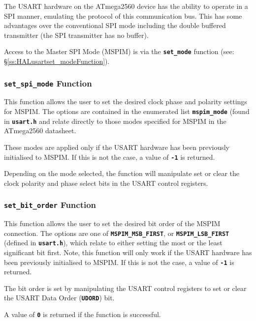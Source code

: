 \documentclass[a4paper, oneside, 11pt, titlepage, onecolumn, openright]{report}
\begin{document}
{{			The USART hardware on the ATmega2560 device has the ability to operate in a SPI manner, emulating the protocol of this communication bus. This has some advantages over the conventional SPI mode including the double buffered transmitter (the SPI transmitter has no buffer).
			
			Access to the Master SPI Mode (MSPIM) is via the \textbf{\texttt{set\_mode}} function (see: \S\ref{ss:HALusartset_modeFunction}).
			
\subsubsection{\textbf{\texttt{set\_spi\_mode}} Function}
			\label{sss:HALusartMasterSPIModeset_spi_modeFunctions}
			
			This function allows the user to set the desired clock phase and polarity settings for MSPIM. The options are contained in the enumerated list \textbf{\texttt{mspim\_mode}} (found in \textbf{\texttt{usart.h}} and relate directly to those modes specified for MSPIM in the ATmega2560 datasheet.
			
			These modes are applied only if the USART hardware has been previously initialised to MSPIM. If this is not the case, a value of \textbf{\texttt{-1}} is returned. 
			
			Depending on the mode selected, the function will manipulate set or clear the clock polarity and phase select bits in the USART control registers.
			
\subsubsection{\textbf{\texttt{set\_bit\_order}} Function}
			\label{sss:HALusartMasterSPIModeset_bit_orderFunctions}
			
			This function allows the user to set the desired bit order of the MSPIM connection. The options are one of \textbf{\texttt{MSPIM\_MSB\_FIRST}}, or \textbf{\texttt{MSPIM\_LSB\_FIRST}} (defined in \textbf{\texttt{usart.h}}), which relate to either setting the most or the least significant bit first. Note, this function will only work if the USART hardware has been previously initialised to MSPIM. If this is not the case, a value of \textbf{\texttt{-1}} is returned. 
			
			The bit order is set by manipulating the USART control registers to set or clear the USART Data Order (\textbf{\texttt{UDORD}}) bit.
			
			A value of \textbf{\texttt{0}} is returned if the function is successful.
			
}}
\end{document}
